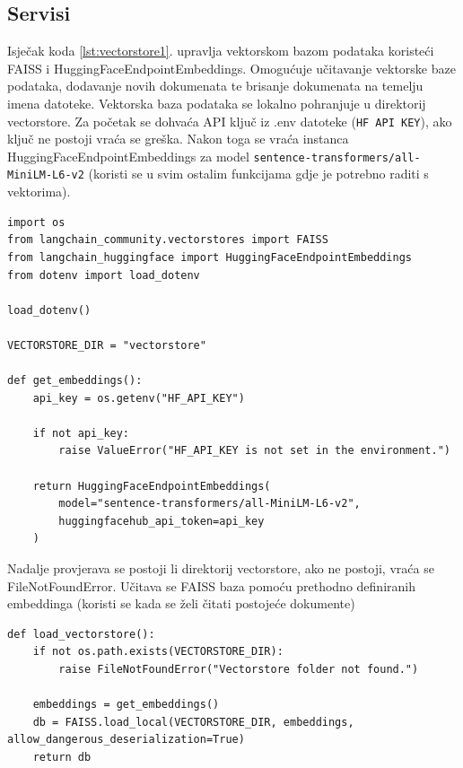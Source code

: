 \documentclass[]{foi}
\begin{document}
\subsection{Servisi}

Isječak koda \ref{lst:vectorstore1}. upravlja vektorskom bazom podataka koristeći FAISS i HuggingFaceEndpointEmbeddings. Omogućuje učitavanje vektorske baze podataka, dodavanje
novih dokumenata te brisanje dokumenata na temelju imena datoteke. Vektorska baza podataka se lokalno pohranjuje u direktorij vectorstore.
Za početak se dohvaća API ključ iz .env datoteke (\texttt{HF API KEY}), ako ključ ne postoji vraća se greška. Nakon toga se vraća instanca 
HuggingFaceEndpointEmbeddings za model \texttt{sentence-transformers/all-MiniLM-L6-v2} (koristi se u svim ostalim funkcijama gdje je potrebno raditi s vektorima).

\begin{longlisting}
\begin{verbatim}
import os
from langchain_community.vectorstores import FAISS
from langchain_huggingface import HuggingFaceEndpointEmbeddings  
from dotenv import load_dotenv

load_dotenv()

VECTORSTORE_DIR = "vectorstore"

def get_embeddings():
    api_key = os.getenv("HF_API_KEY")

    if not api_key:
        raise ValueError("HF_API_KEY is not set in the environment.")

    return HuggingFaceEndpointEmbeddings(
        model="sentence-transformers/all-MiniLM-L6-v2",
        huggingfacehub_api_token=api_key
    )
\end{verbatim}
\caption{Vectorstore.py 1/4}
\label{lst:vectorstore1}
\end{longlisting}

Nadalje provjerava se postoji li direktorij vectorstore, ako ne postoji, vraća se FileNotFoundError. Učitava se FAISS baza pomoću prethodno
definiranih embeddinga (koristi se kada se želi čitati postojeće dokumente)

\begin{longlisting}
\begin{verbatim}
def load_vectorstore():
    if not os.path.exists(VECTORSTORE_DIR):
        raise FileNotFoundError("Vectorstore folder not found.")

    embeddings = get_embeddings()
    db = FAISS.load_local(VECTORSTORE_DIR, embeddings, allow_dangerous_deserialization=True)
    return db
\end{verbatim}
\caption{Vectorstore.py 2/4}
\label{lst:vectorstore2}
\end{longlisting}
\end{document}
